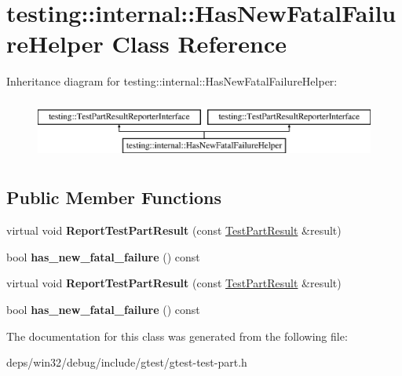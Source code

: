 \hypertarget{classtesting_1_1internal_1_1_has_new_fatal_failure_helper}{}\section{testing\+:\+:internal\+:\+:Has\+New\+Fatal\+Failure\+Helper Class Reference}
\label{classtesting_1_1internal_1_1_has_new_fatal_failure_helper}
Inheritance diagram for testing\+:\+:internal\+:\+:Has\+New\+Fatal\+Failure\+Helper\+:\begin{figure}[H]
\begin{center}
\leavevmode
\includegraphics[height=2.000000cm]{classtesting_1_1internal_1_1_has_new_fatal_failure_helper}
\end{center}
\end{figure}
\subsection*{Public Member Functions}
\begin{DoxyCompactItemize}
\item 
\hypertarget{classtesting_1_1internal_1_1_has_new_fatal_failure_helper_ac7b5e77c9847b2b057cb97193ba82441}{}virtual void {\bfseries Report\+Test\+Part\+Result} (const \hyperlink{classtesting_1_1_test_part_result}{Test\+Part\+Result} \&result)\label{classtesting_1_1internal_1_1_has_new_fatal_failure_helper_ac7b5e77c9847b2b057cb97193ba82441}

\item 
\hypertarget{classtesting_1_1internal_1_1_has_new_fatal_failure_helper_ae137e639098071f11f531bbd72dde1c7}{}bool {\bfseries has\+\_\+new\+\_\+fatal\+\_\+failure} () const \label{classtesting_1_1internal_1_1_has_new_fatal_failure_helper_ae137e639098071f11f531bbd72dde1c7}

\item 
\hypertarget{classtesting_1_1internal_1_1_has_new_fatal_failure_helper_ac7b5e77c9847b2b057cb97193ba82441}{}virtual void {\bfseries Report\+Test\+Part\+Result} (const \hyperlink{classtesting_1_1_test_part_result}{Test\+Part\+Result} \&result)\label{classtesting_1_1internal_1_1_has_new_fatal_failure_helper_ac7b5e77c9847b2b057cb97193ba82441}

\item 
\hypertarget{classtesting_1_1internal_1_1_has_new_fatal_failure_helper_ae137e639098071f11f531bbd72dde1c7}{}bool {\bfseries has\+\_\+new\+\_\+fatal\+\_\+failure} () const \label{classtesting_1_1internal_1_1_has_new_fatal_failure_helper_ae137e639098071f11f531bbd72dde1c7}

\end{DoxyCompactItemize}


The documentation for this class was generated from the following file\+:\begin{DoxyCompactItemize}
\item 
deps/win32/debug/include/gtest/gtest-\/test-\/part.\+h\end{DoxyCompactItemize}
